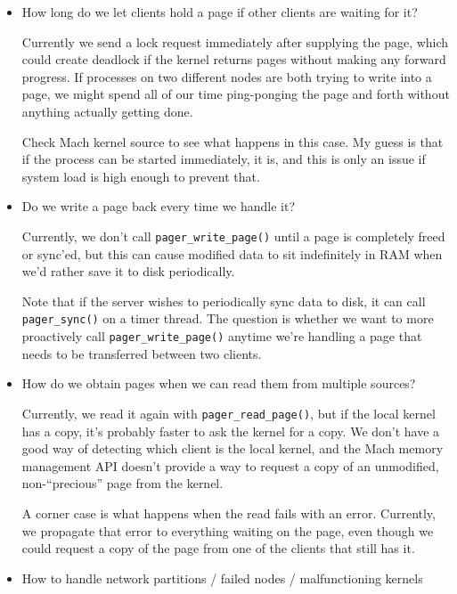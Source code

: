 \documentclass{article}
\begin{document}
\begin{itemize}

\item How long do we let clients hold a page if other clients are waiting for it?

  Currently we send a lock request immediately after supplying the
  page, which could create deadlock if the kernel returns pages
  without making any forward progress.  If processes on two different
  nodes are both trying to write into a page, we might spend all of
  our time ping-ponging the page and forth without anything actually
  getting done.

  Check Mach kernel source to see what happens in this case.  My guess
  is that if the process can be started immediately, it is, and this
  is only an issue if system load is high enough to prevent that.

\item Do we write a page back every time we handle it?

  Currently, we don't call {\tt pager_write_page()} until a page is
  completely freed or sync'ed, but this can cause modified data to sit
  indefinitely in RAM when we'd rather save it to disk periodically.

  Note that if the server wishes to periodically sync data to disk, it
  can call {\tt pager_sync()} on a timer thread.  The question is
  whether we want to more proactively call {\tt pager_write_page()}
  anytime we're handling a page that needs to be transferred between
  two clients.

\item How do we obtain pages when we can read them from multiple sources?

  Currently, we read it again with {\tt pager_read_page()}, but if the
  local kernel has a copy, it's probably faster to ask the kernel for
  a copy.  We don't have a good way of detecting which client is the
  local kernel, and the Mach memory management API doesn't provide a
  way to request a copy of an unmodified, non-``precious'' page
  from the kernel.

  A corner case is what happens when the read fails with an error.
  Currently, we propagate that error to everything waiting on the
  page, even though we could request a copy of the page from one
  of the clients that still has it.

\item How to handle network partitions / failed nodes / malfunctioning kernels


\end{itemize}
\end{document}
